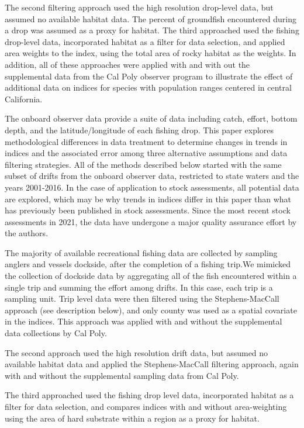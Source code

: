 \documentclass[preprint, 3p,
authoryear]{elsarticle} %
\begin{document}
The second filtering approach used the high resolution drop-level data,
but assumed no available habitat data. The percent of groundfish
encountered during a drop was assumed as a proxy for habitat. The third
approached used the fishing drop-level data, incorporated habitat as a
filter for data selection, and applied area weights to the index, using
the total area of rocky habitat as the weights. In addition, all of
these approaches were applied with and with out the supplemental data
from the Cal Poly observer program to illustrate the effect of
additional data on indices for species with population ranges centered
in central California.

The onboard observer data provide a suite of data including catch,
effort, bottom depth, and the latitude/longitude of each fishing drop.
This paper explores methodological differences in data treatment to
determine changes in trends in indices and the associated error among
three alternative assumptions and data filtering strategies. All of the
methods described below started with the same subset of drifts from the
onboard observer data, restricted to state waters and the years
2001-2016. In the case of application to stock assessments, all
potential data are explored, which may be why trends in indices differ
in this paper than what has previously been published in stock
assessments. Since the most recent stock assessments in 2021, the data
have undergone a major quality assurance effort by the authors.

The majority of available recreational fishing data are collected by
sampling anglers and vessels dockside, after the completion of a fishing
trip.We mimicked the collection of dockside data by aggregating all of
the fish encountered within a single trip and summing the effort among
drifts. In this case, each trip is a sampling unit. Trip level data were
then filtered using the Stephens-MacCall approach (see description
below), and only county was used as a spatial covariate in the indices.
This approach was applied with and without the supplemental data
collections by Cal Poly.

The second approach used the high resolution drift data, but assumed no
available habitat data and applied the Stephens-MacCall filtering
approach, again with and without the supplemental sampling data from Cal
Poly.

The third approached used the fishing drop level data, incorporated
habitat as a filter for data selection, and compares indices with and
without area-weighting using the area of hard substrate within a region
as a proxy for habitat.
\end{document}
